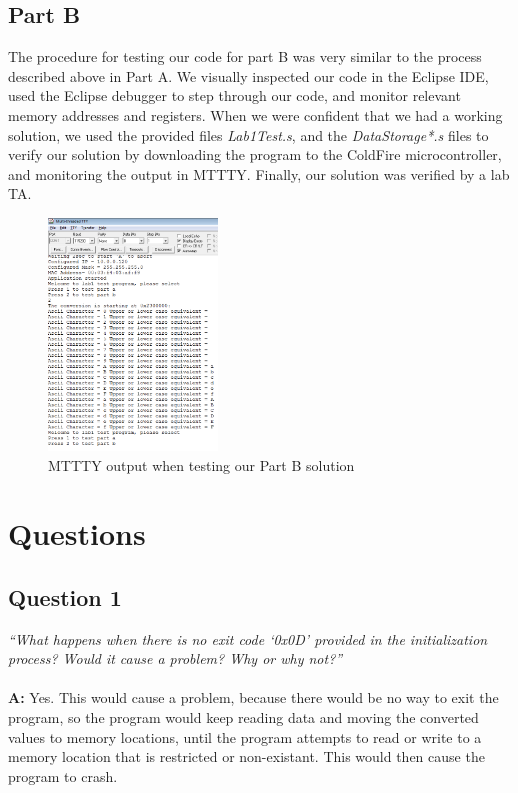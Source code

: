 \documentclass[letterpaper]{article}
\begin{document}
  \subsection{Part B}
    The procedure for testing our code for part B was very similar to the process
    described above in Part A. We visually inspected our code in the Eclipse IDE,
    used the Eclipse debugger to step through our code, and monitor relevant
    memory addresses and registers. When we were confident that we had a working
    solution, we used the provided files \textit{Lab1Test.s}, and the \textit{DataStorage*.s}
    files to verify our solution by downloading the program to the ColdFire microcontroller,
    and monitoring the output in MTTTY. Finally, our solution was verified by a lab TA.

    \begin{figure}[H]
      \centering
      \includegraphics[width=0.4\textwidth]{tst1b.png}
      \caption{MTTTY output when testing our Part B solution}
    \end{figure}

\section{Questions}

    \subsection{Question 1}
      \textit{``What happens when there is no exit code ‘0x0D’ provided in the initialization process? Would it cause a problem? Why or why not?''}
      \\ \\
      \noindent\textbf{A:}
      Yes. This would cause a problem, because there would be no way to exit the program,
      so the program would keep reading data and moving the converted values to
      memory locations, until the program attempts to read or write to a memory
      location that is restricted or non-existant. This would then cause the
      program to crash.
\end{document}
